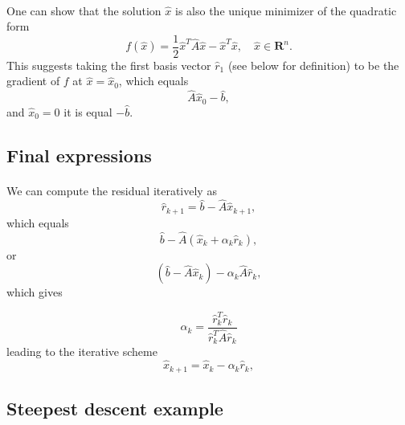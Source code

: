 \documentclass[%
oneside,                 %
final,                   %
10pt]{article}
\begin{document}
\paragraph{}
One can show that the solution $\hat{x}$ is also the unique minimizer of the quadratic form
\begin{equation*}
  f(\hat{x}) = \frac{1}{2}\hat{x}^T\hat{A}\hat{x} - \hat{x}^T \hat{x} , \quad \hat{x}\in\mathbf{R}^n. 
\end{equation*}
This suggests taking the first basis vector $\hat{r}_1$ (see below for definition) 
to be the gradient of $f$ at $\hat{x}=\hat{x}_0$, 
which equals
\begin{equation*}
\hat{A}\hat{x}_0-\hat{b},
\end{equation*}
and 
$\hat{x}_0=0$ it is equal $-\hat{b}$.



\subsection*{Final expressions}

\paragraph{}
We can compute the residual iteratively as
\begin{equation*}
\hat{r}_{k+1}=\hat{b}-\hat{A}\hat{x}_{k+1},
 \end{equation*}
which equals
\begin{equation*}
\hat{b}-\hat{A}(\hat{x}_k+\alpha_k\hat{r}_k),
 \end{equation*}
or
\begin{equation*}
(\hat{b}-\hat{A}\hat{x}_k)-\alpha_k\hat{A}\hat{r}_k,
 \end{equation*}
which gives

\[
\alpha_k = \frac{\hat{r}_k^T\hat{r}_k}{\hat{r}_k^T\hat{A}\hat{r}_k}
\]
leading to the iterative scheme
\begin{equation*}
\hat{x}_{k+1}=\hat{x}_k-\alpha_k\hat{r}_{k},
 \end{equation*}



\subsection*{Steepest descent example}
\end{document}
